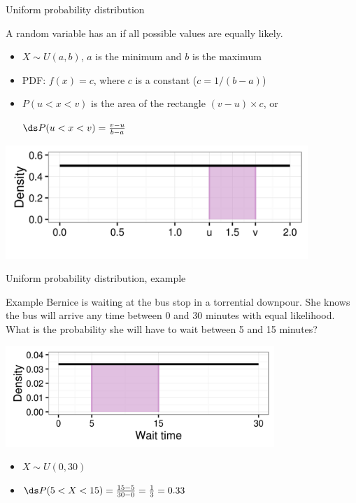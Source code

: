 \documentclass[xcolor=table]{beamer}
\begin{document}
\begin{frame}{Uniform probability distribution}
\begin{block}{}
{\large A random variable has an  if all possible values are equally likely.}
\begin{itemize}
\pause\item $X \sim U(a,b)$, $a$ is the minimum and $b$ is the maximum
\pause\item PDF: $f(x) = c$, where $c$ is a constant ($c = 1/(b-a)$)
\pause\item $P(u < x < v)$ is the area of the rectangle $(v-u) \times c$, or\\
\smallskip
{\centering $\ds P(u < x < v) = \frac {v-u}{b-a}$ \par} 
\end{itemize}
\end{block}
\smallskip
{\centering
\includegraphics[width=4.5in]{../images/ch6_uniform}
\par}

\end{frame}

\begin{frame}{Uniform probability distribution, example}
\begin{exampleblock}{Example}
Bernice is waiting at the bus stop in a torrential downpour. She knows the bus will arrive any time between 0 and 30 minutes with equal likelihood. What is the probability she will have to wait between 5 and 15 minutes?\\
\smallskip
{\centering
\includegraphics[width=4in]{../images/ch6_bus}
\par}
\begin{itemize}
\pause\item $X \sim U(0,30)$
\pause\item $\ds P(5 < X < 15) = \frac{15-5}{30-0} = \frac 1 3 = 0.33$
\end{itemize}
\end{exampleblock}
\end{frame}
\end{document}
